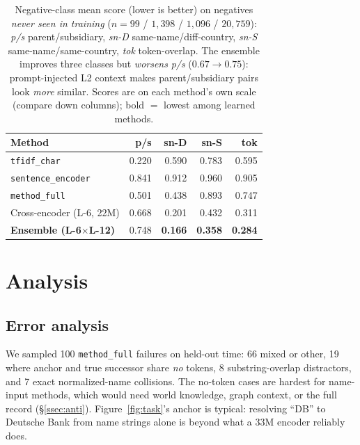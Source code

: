 \documentclass[sigconf]{acmart}
\begin{document}
\begin{table}[t]
  \centering
  \scriptsize
  \caption{Negative-class mean score (lower is better) on
    negatives \emph{never seen in training} ($n{=}99$ / $1{,}398$ / $1{,}096$ / $20{,}759$): \emph{p/s} parent/subsidiary, \emph{sn-D}
    same-name/diff-country, \emph{sn-S} same-name/same-country,
    \emph{tok} token-overlap. The ensemble improves three classes
    but \emph{worsens} \emph{p/s} ($0.67 \to 0.75$):
    prompt-injected L2 context makes parent/subsidiary pairs look
    \emph{more} similar. Scores are on each method's own scale
    (compare down columns); bold $=$ lowest among learned methods.}
  \label{tab:neg_class}
  \begin{tabular}{l rrrr}
    \toprule
    Method & p/s & sn-D & sn-S & tok \\
    \midrule
    \texttt{tfidf\_char}             & 0.220 & 0.590 & 0.783 & 0.595 \\
    \texttt{sentence\_encoder}       & 0.841 & 0.912 & 0.960 & 0.905 \\
    \texttt{method\_full}            & 0.501 & 0.438 & 0.893 & 0.747 \\
    Cross-encoder (L-6, 22M)        & 0.668 & 0.201 & 0.432 & 0.311 \\
    \textbf{Ensemble (L-6$\times$L-12)} & 0.748 & \textbf{0.166} & \textbf{0.358} & \textbf{0.284} \\
    \bottomrule
  \end{tabular}
\end{table}

\section{Analysis}

\subsection{Error analysis}
\label{ssec:err}

We sampled 100 \texttt{method\_full} failures on held-out time:
66 mixed or other, 19 where anchor and true successor share
\emph{no} tokens, 8 substring-overlap distractors, and 7 exact
normalized-name collisions. The no-token cases are hardest for
name-input methods, which would need world knowledge, graph
context, or the full record (\S\ref{ssec:anti}).
Figure~\ref{fig:task}'s anchor is typical: resolving ``DB'' to
Deutsche Bank from name strings alone is beyond what a 33M encoder
reliably does.
\end{document}
